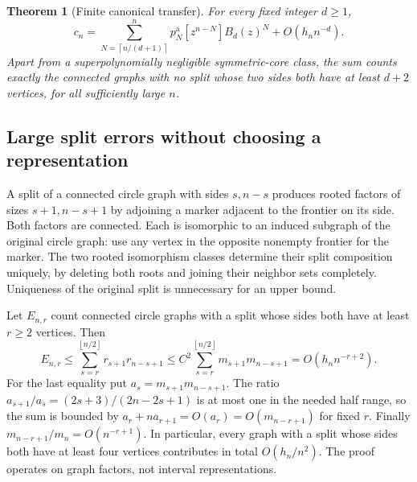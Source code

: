 \documentclass[11pt,letterpaper]{article}
\numberwithin{equation}{section}
\newtheorem{theorem}{Theorem}[section]
\theoremstyle{definition}\newtheorem{definition}[theorem]{Definition}
\theoremstyle{remark}\newtheorem{remark}[theorem]{Remark}
\newcommand{\ceil}[1]{\left\lceil #1\right\rceil}
\newcommand{\floor}[1]{\left\lfloor #1\right\rfloor}
\begin{document}
\begin{theorem}[Finite canonical transfer]\label{cgr:fc:thm:finite-transfer}
For every fixed integer $d\ge1$,
\begin{equation}\label{cgr:fc:eq:finite-transfer}
 c_n=\sum_{N=\ceil{n/(d+1)}}^n p_N^{\mathrm a}
           [z^{n-N}]B_d(z)^N+O(h_n n^{-d}).
\end{equation}
Apart from a superpolynomially negligible symmetric-core class,
the sum counts exactly the connected graphs with no split whose
two sides both have at least $d+2$ vertices, for all sufficiently
large $n$.
\end{theorem}

\subsection{Large split errors without choosing a representation}
A split of a connected circle graph with sides $s,n-s$ produces rooted factors of sizes
$s+1,n-s+1$ by adjoining a marker adjacent to the frontier on
its side. Both factors are connected. Each is isomorphic to an
induced subgraph of the original circle graph: use any vertex in
the opposite nonempty frontier for the marker. The two rooted
isomorphism classes determine their split composition uniquely,
by deleting both roots and joining their neighbor sets completely.
Uniqueness of the original split is unnecessary for an upper bound.

Let $E_{n,r}$ count connected circle graphs with a split whose sides both have at
least $r\ge2$ vertices. Then
\begin{equation}\label{cgr:fc:eq:large-split}
 E_{n,r}\le\sum_{s=r}^{\floor{n/2}}r_{s+1}r_{n-s+1}
 \le C^2\sum_{s=r}^{\floor{n/2}}m_{s+1}m_{n-s+1}
 =O(h_n n^{-r+2}).
\end{equation}
For the last equality put $a_s=m_{s+1}m_{n-s+1}$.
The ratio $a_{s+1}/a_s=(2s+3)/(2n-2s+1)$ is at most one in
the needed half range, so the sum is bounded by
$a_r+na_{r+1}=O(a_r)=O(m_{n-r+1})$ for fixed $r$.
Finally $m_{n-r+1}/m_n=O(n^{-r+1})$.
In particular, every graph with a split whose sides both have at
least four vertices contributes in total $O(h_n/n^2)$.
The proof operates on graph factors, not interval representations.
\end{document}
